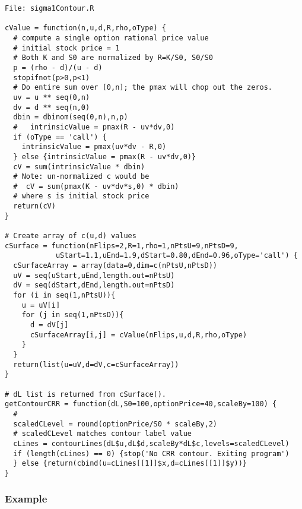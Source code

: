 \documentclass[10pt]{article}
\begin{document}
\begin{verbatim}
File: sigma1Contour.R

cValue = function(n,u,d,R,rho,oType) {
  # compute a single option rational price value
  # initial stock price = 1
  # Both K and S0 are normalized by R=K/S0, S0/S0
  p = (rho - d)/(u - d)
  stopifnot(p>0,p<1)
  # Do entire sum over [0,n]; the pmax will chop out the zeros.
  uv = u ** seq(0,n)
  dv = d ** seq(n,0)
  dbin = dbinom(seq(0,n),n,p)
  #   intrinsicValue = pmax(R - uv*dv,0)
  if (oType == 'call') {
    intrinsicValue = pmax(uv*dv - R,0)
  } else {intrinsicValue = pmax(R - uv*dv,0)}
  cV = sum(intrinsicValue * dbin)
  # Note: un-normalized c would be
  #  cV = sum(pmax(K - uv*dv*s,0) * dbin)
  # where s is initial stock price
  return(cV)
}

# Create array of c(u,d) values
cSurface = function(nFlips=2,R=1,rho=1,nPtsU=9,nPtsD=9,
            uStart=1.1,uEnd=1.9,dStart=0.80,dEnd=0.96,oType='call') {
  cSurfaceArray = array(data=0,dim=c(nPtsU,nPtsD))
  uV = seq(uStart,uEnd,length.out=nPtsU)
  dV = seq(dStart,dEnd,length.out=nPtsD)
  for (i in seq(1,nPtsU)){
    u = uV[i]
    for (j in seq(1,nPtsD)){
      d = dV[j]
      cSurfaceArray[i,j] = cValue(nFlips,u,d,R,rho,oType)
    }
  }
  return(list(u=uV,d=dV,c=cSurfaceArray))
}

# dL list is returned from cSurface().
getContourCRR = function(dL,S0=100,optionPrice=40,scaleBy=100) {
  #
  scaledCLevel = round(optionPrice/S0 * scaleBy,2)
  # scaledCLevel matches contour label value
  cLines = contourLines(dL$u,dL$d,scaleBy*dL$c,levels=scaledCLevel)
  if (length(cLines) == 0) {stop('No CRR contour. Exiting program')
  } else {return(cbind(u=cLines[[1]]$x,d=cLines[[1]]$y))}
}
\end{verbatim}

\subsubsection*{Example}
\end{document}
